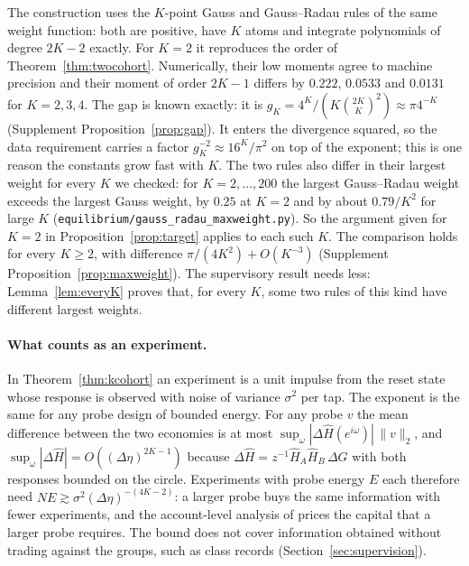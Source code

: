 \documentclass[12pt]{article}
\theoremstyle{definition}
\theoremstyle{remark}
\begin{document}
The construction uses the $K$-point Gauss and Gauss--Radau rules of the same weight function: both are positive, have $K$ atoms and integrate polynomials of degree $2K-2$ exactly. For $K=2$ it reproduces the order of Theorem~\ref{thm:twocohort}. Numerically, their low moments agree to machine precision and their moment of order $2K-1$ differs by $0.222$, $0.0533$ and $0.0131$ for $K=2,3,4$. The gap is known exactly: it is $g_K=4^K/(K\binom{2K}{K}^2)\approx\pi4^{-K}$ (Supplement Proposition~\ref{prop:gap}). It enters the divergence squared, so the data requirement carries a factor $g_K^{-2}\approx16^K/\pi^2$ on top of the exponent; this is one reason the constants grow fast with $K$. The two rules also differ in their largest weight for every $K$ we checked: for $K=2,\ldots,200$ the largest Gauss--Radau weight exceeds the largest Gauss weight, by $0.25$ at $K=2$ and by about $0.79/K^2$ for large $K$ (\nolinkurl{equilibrium/gauss_radau_maxweight.py}). So the argument given for $K=2$ in Proposition~\ref{prop:target} applies to each such $K$. The comparison holds for every $K\ge2$, with difference $\pi/(4K^2)+O(K^{-3})$ (Supplement Proposition~\ref{prop:maxweight}). The supervisory result needs less: Lemma~\ref{lem:everyK} proves that, for every $K$, some two rules of this kind have different largest weights.

\paragraph{What counts as an experiment.} In Theorem~\ref{thm:kcohort} an experiment is a unit impulse from the reset state whose response is observed with noise of variance $\sigma^2$ per tap. The exponent is the same for any probe design of bounded energy. For any probe $v$ the mean difference between the two economies is at most $\sup_\omega|\Delta\hat H(e^{i\omega})|\,\|v\|_2$, and $\sup_\omega|\Delta\hat H|=O((\Delta\eta)^{2K-1})$ because $\Delta\hat H=z^{-1}\hat H_A\hat H_B\,\Delta G$ with both responses bounded on the circle. Experiments with probe energy $E$ each therefore need $NE\gtrsim\sigma^2(\Delta\eta)^{-(4K-2)}$: a larger probe buys the same information with fewer experiments, and the account-level analysis of \citet{niroula2026a} prices the capital that a larger probe requires. The bound does not cover information obtained without trading against the groups, such as class records (Section~\ref{sec:supervision}).
\end{document}
